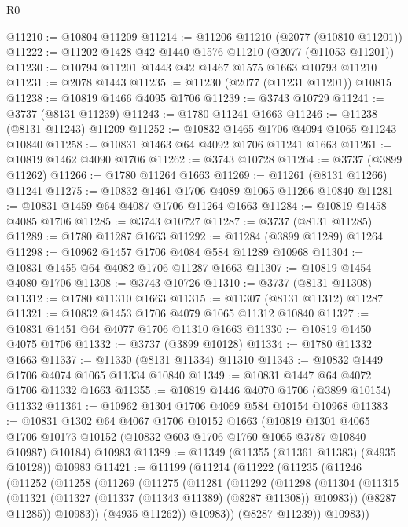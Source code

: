 \begin{lexlean}{R0}
\begin{coremodule}
@11210 := @10804 @11209
@11214 := @11206 @11210 (@2077 (@10810 @11201))
@11222 := @11202 @1428 @42 @1440 @1576 @11210 (@2077 (@11053 @11201))
@11230 := @10794 @11201 @1443 @42 @1467 @1575 @1663 @10793 @11210
@11231 := @2078 @1443
@11235 := @11230 (@2077 (@11231 @11201)) @10815
@11238 := @10819 @1466 @4095 @1706
@11239 := @3743 @10729
@11241 := @3737 (@8131 @11239)
@11243 := @1780 @11241 @1663
@11246 := @11238 (@8131 @11243) @11209
@11252 := @10832 @1465 @1706 @4094 @1065 @11243 @10840
@11258 := @10831 @1463 @64 @4092 @1706 @11241 @1663
@11261 := @10819 @1462 @4090 @1706
@11262 := @3743 @10728
@11264 := @3737 (@3899 @11262)
@11266 := @1780 @11264 @1663
@11269 := @11261 (@8131 @11266) @11241
@11275 := @10832 @1461 @1706 @4089 @1065 @11266 @10840
@11281 := @10831 @1459 @64 @4087 @1706 @11264 @1663
@11284 := @10819 @1458 @4085 @1706
@11285 := @3743 @10727
@11287 := @3737 (@8131 @11285)
@11289 := @1780 @11287 @1663
@11292 := @11284 (@3899 @11289) @11264
@11298 := @10962 @1457 @1706 @4084 @584 @11289 @10968
@11304 := @10831 @1455 @64 @4082 @1706 @11287 @1663
@11307 := @10819 @1454 @4080 @1706
@11308 := @3743 @10726
@11310 := @3737 (@8131 @11308)
@11312 := @1780 @11310 @1663
@11315 := @11307 (@8131 @11312) @11287
@11321 := @10832 @1453 @1706 @4079 @1065 @11312 @10840
@11327 := @10831 @1451 @64 @4077 @1706 @11310 @1663
@11330 := @10819 @1450 @4075 @1706
@11332 := @3737 (@3899 @10128)
@11334 := @1780 @11332 @1663
@11337 := @11330 (@8131 @11334) @11310
@11343 := @10832 @1449 @1706 @4074 @1065 @11334 @10840
@11349 := @10831 @1447 @64 @4072 @1706 @11332 @1663
@11355 := @10819 @1446 @4070 @1706 (@3899 @10154) @11332
@11361 := @10962 @1304 @1706 @4069 @584 @10154 @10968
@11383 := @10831
    @1302
    @64
    @4067
    @1706
    @10152
    @1663
    (@10819
      @1301
      @4065
      @1706
      @10173
      @10152
      (@10832 @603 @1706 @1760 @1065 @3787 @10840 @10987)
      @10184)
    @10983
@11389 := @11349 (@11355 (@11361 @11383) (@4935 @10128)) @10983
@11421 := @11199
    (@11214
      (@11222
        (@11235
          (@11246
            (@11252
              (@11258
                (@11269
                  (@11275
                    (@11281
                      (@11292
                        (@11298
                          (@11304
                            (@11315
                              (@11321 (@11327 (@11337 (@11343 @11389) (@8287 @11308)) @10983))
                              (@8287 @11285))
                            @10983))
                        (@4935 @11262))
                      @10983))
                  (@8287 @11239))
                @10983))

\end{coremodule}
\end{lexlean}
